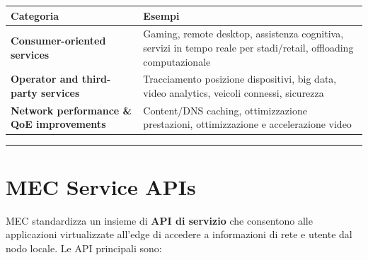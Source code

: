 \documentclass[
  italian,
  openany]{book}
\newcounter{none} %
\begin{document}
{\def\LTcaptype{none} %
\begin{longtable}[]{@{}
  >{\raggedright\arraybackslash}p{}
  >{\raggedright\arraybackslash}p{}@{}}
\toprule\noalign{}
\begin{minipage}[b]{\linewidth}\raggedright
Categoria
\end{minipage} & \begin{minipage}[b]{\linewidth}\raggedright
Esempi
\end{minipage} \\
\midrule\noalign{}
\endhead
\bottomrule\noalign{}
\endlastfoot
\textbf{Consumer-oriented services} & Gaming, remote desktop, assistenza
cognitiva, servizi in tempo reale per stadi/retail, offloading
computazionale \\
\textbf{Operator and third-party services} & Tracciamento posizione
dispositivi, big data, video analytics, veicoli connessi, sicurezza \\
\textbf{Network performance \& QoE improvements} & Content/DNS caching,
ottimizzazione prestazioni, ottimizzazione e accelerazione video \\
\end{longtable}
}

\begin{center}\rule{0.5\linewidth}{0.5pt}\end{center}

\section{MEC Service APIs}\label{mec-service-apis}

MEC standardizza un insieme di \textbf{API di servizio} che consentono
alle applicazioni virtualizzate all'edge di accedere a informazioni di
rete e utente dal nodo locale. Le API principali sono:
\end{document}
